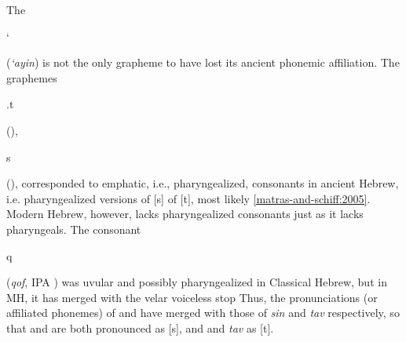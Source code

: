 The \begin{cjhebrew}`\end{cjhebrew} (\textit{`ayin}) is not the only 
grapheme to have 
lost its ancient phonemic affiliation. 
The graphemes \begin{cjhebrew}.t\end{cjhebrew} 
(\textit{}), \begin{cjhebrew}s\end{cjhebrew} 
(\textit{}), corresponded to emphatic, i.e., pharyngealized, consonants in ancient Hebrew, i.e. pharyngealized versions of [s] of [t], most likely \ref{matras-and-schiff:2005}.
Modern Hebrew, however, lacks pharyngealized consonants just as it lacks pharyngeals. 
The consonant \begin{cjhebrew}q\end{cjhebrew} (\textit{qof}, IPA \textipa{[q]}) was uvular and 
possibly pharyngealized in Classical Hebrew, but in MH, it has merged with the velar voiceless stop
 Thus, the pronunciations (or affiliated phonemes) of \textit{} and \textit{} have merged with those of \textit{sin} and \textit{tav} respectively, so that \textit{} and \textit{} are both pronounced as [s], and \textit{} and \textit{tav} as [t].
%


